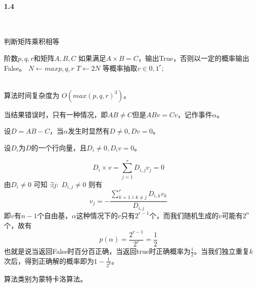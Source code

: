 \paragraph{1.4}~{}
\begin{algorithm}[H]  
    \caption{判断矩阵乘积相等}  
    \begin{algorithmic}[1]
        \Require 阶数$p,q,r$和矩阵$A,B,C$
        \Ensure 如果满足$A \times B = C$，输出True，否则以一定的概率输出False。
        \State $N \leftarrow max{p,q,r}$
        \State $T \leftarrow 2N$
            等概率抽取$v \in {0,1}^r$;
             \\
            \EndIf
        \EndFor \\
    \end{algorithmic}
\end{algorithm}  

算法时间复杂度为 $O(max(p,q,r)^3)$。

当结果错误时，只有一种情况，即$AB \ne C$但是$ABv=Cv$，记作事件$\alpha$。

设$D=AB-C$，当$\alpha$发生时显然有$D \ne 0, Dv = 0$。

设$D_i$为$D$的一个行向量，且$D_i \ne 0, D_iv = 0$。

$$D_i \times v = \sum_{j=1}^{r}D_{i,j}v_j = 0$$
由$D_i \ne 0$ 可知 $\exists j: \; D_{i,j} \ne 0$
则有
$$v_j=- \frac{\sum_{k=1 \land k \ne j}^{r}D_{i,k}v_k}{D_{i,j}}$$
即$v$有$n-1$个自由基，$\alpha$这种情况下的$v$只有$2^{r-1}$个，而我们随机生成的$v$可能有$2^n$个，故有
$$p(\alpha) = \frac{2^{r-1}}{2^r}=\frac{1}{2}$$
也就是说当返回False时百分百正确，当返回true时正确概率为$\frac{1}{2}$。当我们独立重复$k$次后，得到正确解的概率即为$1-\frac{1}{2^k}$。

算法类别为蒙特卡洛算法。